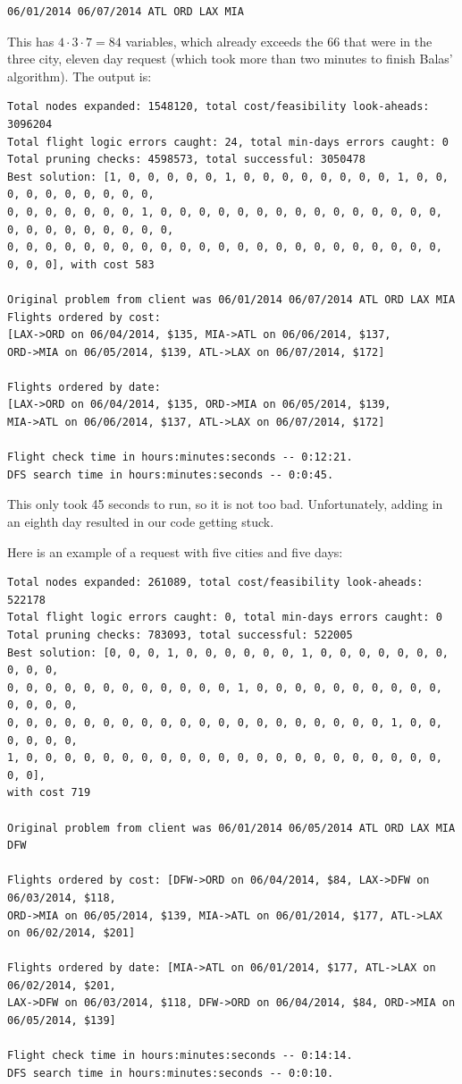 \documentclass{article}
\begin{document}
\begin{verbatim}
06/01/2014 06/07/2014 ATL ORD LAX MIA
\end{verbatim}

This has $4 \cdot 3 \cdot 7 = 84$ variables, which already exceeds the 66 that were in the three city, eleven day request (which took more than two
minutes to finish Balas' algorithm). The output is:

\scriptsize
\begin{verbatim}
Total nodes expanded: 1548120, total cost/feasibility look-aheads: 3096204
Total flight logic errors caught: 24, total min-days errors caught: 0
Total pruning checks: 4598573, total successful: 3050478
Best solution: [1, 0, 0, 0, 0, 0, 1, 0, 0, 0, 0, 0, 0, 0, 0, 1, 0, 0, 0, 0, 0, 0, 0, 0, 0, 0,
0, 0, 0, 0, 0, 0, 0, 1, 0, 0, 0, 0, 0, 0, 0, 0, 0, 0, 0, 0, 0, 0, 0, 0, 0, 0, 0, 0, 0, 0, 0, 0,
0, 0, 0, 0, 0, 0, 0, 0, 0, 0, 0, 0, 0, 0, 0, 0, 0, 0, 0, 0, 0, 0, 0, 0, 0, 0], with cost 583

Original problem from client was 06/01/2014 06/07/2014 ATL ORD LAX MIA
Flights ordered by cost:
[LAX->ORD on 06/04/2014, $135, MIA->ATL on 06/06/2014, $137,
ORD->MIA on 06/05/2014, $139, ATL->LAX on 06/07/2014, $172]

Flights ordered by date:
[LAX->ORD on 06/04/2014, $135, ORD->MIA on 06/05/2014, $139,
MIA->ATL on 06/06/2014, $137, ATL->LAX on 06/07/2014, $172]

Flight check time in hours:minutes:seconds -- 0:12:21.
DFS search time in hours:minutes:seconds -- 0:0:45.
\end{verbatim}
\normalsize

This only took 45 seconds to run, so it is not too bad. Unfortunately, adding in an eighth day resulted in our code getting stuck.

Here is an example of a request with five cities and five days:


\scriptsize
\begin{verbatim}
Total nodes expanded: 261089, total cost/feasibility look-aheads: 522178
Total flight logic errors caught: 0, total min-days errors caught: 0
Total pruning checks: 783093, total successful: 522005
Best solution: [0, 0, 0, 1, 0, 0, 0, 0, 0, 0, 1, 0, 0, 0, 0, 0, 0, 0, 0, 0, 0,
0, 0, 0, 0, 0, 0, 0, 0, 0, 0, 0, 0, 1, 0, 0, 0, 0, 0, 0, 0, 0, 0, 0, 0, 0, 0, 0,
0, 0, 0, 0, 0, 0, 0, 0, 0, 0, 0, 0, 0, 0, 0, 0, 0, 0, 0, 0, 1, 0, 0, 0, 0, 0, 0,
1, 0, 0, 0, 0, 0, 0, 0, 0, 0, 0, 0, 0, 0, 0, 0, 0, 0, 0, 0, 0, 0, 0, 0, 0],
with cost 719

Original problem from client was 06/01/2014 06/05/2014 ATL ORD LAX MIA DFW

Flights ordered by cost: [DFW->ORD on 06/04/2014, $84, LAX->DFW on 06/03/2014, $118,
ORD->MIA on 06/05/2014, $139, MIA->ATL on 06/01/2014, $177, ATL->LAX on 06/02/2014, $201]

Flights ordered by date: [MIA->ATL on 06/01/2014, $177, ATL->LAX on 06/02/2014, $201,
LAX->DFW on 06/03/2014, $118, DFW->ORD on 06/04/2014, $84, ORD->MIA on 06/05/2014, $139]

Flight check time in hours:minutes:seconds -- 0:14:14.
DFS search time in hours:minutes:seconds -- 0:0:10.
\end{verbatim}
\normalsize
\end{document}
